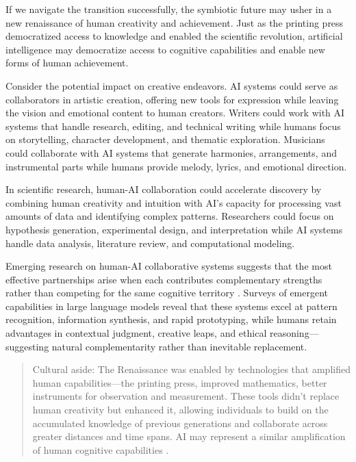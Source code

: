If we navigate the transition successfully, the symbiotic future may usher in a new renaissance of human creativity and achievement. Just as the printing press democratized access to knowledge and enabled the scientific revolution, artificial intelligence may democratize access to cognitive capabilities and enable new forms of human achievement.

Consider the potential impact on creative endeavors. AI systems could serve as collaborators in artistic creation, offering new tools for expression while leaving the vision and emotional content to human creators. Writers could work with AI systems that handle research, editing, and technical writing while humans focus on storytelling, character development, and thematic exploration. Musicians could collaborate with AI systems that generate harmonies, arrangements, and instrumental parts while humans provide melody, lyrics, and emotional direction.

In scientific research, human-AI collaboration could accelerate discovery by combining human creativity and intuition with AI's capacity for processing vast amounts of data and identifying complex patterns. Researchers could focus on hypothesis generation, experimental design, and interpretation while AI systems handle data analysis, literature review, and computational modeling.

Emerging research on human-AI collaborative systems suggests that the most effective partnerships arise when each contributes complementary strengths rather than competing for the same cognitive territory \parencite{berti2025emergent}. Surveys of emergent capabilities in large language models reveal that these systems excel at pattern recognition, information synthesis, and rapid prototyping, while humans retain advantages in contextual judgment, creative leaps, and ethical reasoning—suggesting natural complementarity rather than inevitable replacement.

\begin{quote}\small
Cultural aside: The Renaissance was enabled by technologies that amplified human capabilities—the printing press, improved mathematics, better instruments for observation and measurement. These tools didn't replace human creativity but enhanced it, allowing individuals to build on the accumulated knowledge of previous generations and collaborate across greater distances and time spans. AI may represent a similar amplification of human cognitive capabilities \parencite{eisenstein1979printing}.
\end{quote}


